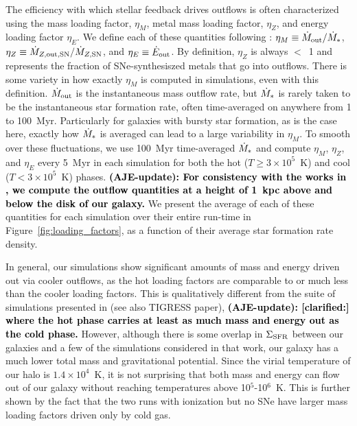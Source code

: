 \documentclass[twocolumn]{aastex62}
\newcommand{\changed}[1]{\textcolor{black}{\textbf{(AJE-update): #1}}}
\begin{document}
The efficiency with which stellar feedback drives outflows is often characterized using the mass loading factor, $\eta_M$, metal mass loading factor, $\eta_Z$, and energy loading factor $\eta_E$. We define each of these quantities following \cite{LiBryan2020}: $\eta_M \equiv \dot{M}_{\rm out} / \dot{M}_{\rm *}$, $\eta_Z \equiv \dot{M}_{Z,\rm{out},\rm{SN}} / \dot{M}_{Z,\rm{SN}}$, and $\eta_E \equiv \dot{E}_{\rm out}$. By definition, $\eta_Z$ is always $<$~1 and represents the fraction of SNe-synthesiszed metals that go into outflows. There is some variety in how exactly $\eta_M$ is computed in simulations, even with this definition. $\dot{M}_{\rm out}$ is the instantaneous mass outflow rate, but $\dot{M}_{\rm *}$ is rarely taken to be the instantaneous star formation rate, often time-averaged on anywhere from 1 to 100~Myr. Particularly for galaxies with bursty star formation, as is the case here, exactly how $\dot{M}_{\rm *}$ is averaged can lead to a large variability in $\eta_M$. To smooth over these fluctuations, we use 100~Myr time-averaged $\dot{M}_{\rm *}$ and compute $\eta_M$, $\eta_Z$, and $\eta_E$ every 5~Myr in each simulation for both the hot ($T \geq 3 \times 10^5$~K) and cool ($T < 3\times10^5$~K) phases. \changed{For consistency with the works in \citet{LiBryan2020}, we compute the outflow quantities at a height of 1~kpc above and below the disk of our galaxy.}  We present the average of each of these quantities for each simulation over their entire run-time in Figure~\ref{fig:loading_factors}, as a function of their average star formation rate density.

In general, our simulations show significant amounts of mass and energy driven out via cooler outflows, as the hot loading factors are comparable to or much less than the cooler loading factors. This is qualitatively different from the suite of simulations presented in \cite{LiBryan2020} (see also TIGRESS paper), \changed{[clarified:] where the hot phase carries at least as much mass and energy out as the cold phase.} However, although there is some overlap in $\Sigma_{\rm SFR}$ between our galaxies and a few of the simulations considered in that work, our galaxy has a much lower total mass and gravitational potential. Since the virial temperature of our halo is $1.4 \times 10^4$~K, it is not surprising that both mass and energy can flow out of our galaxy without reaching temperatures above 10$^5$-10$^6$~K. This is further shown by the fact that the two runs with ionization but no SNe have larger mass loading factors driven only by cold gas.
\end{document}
